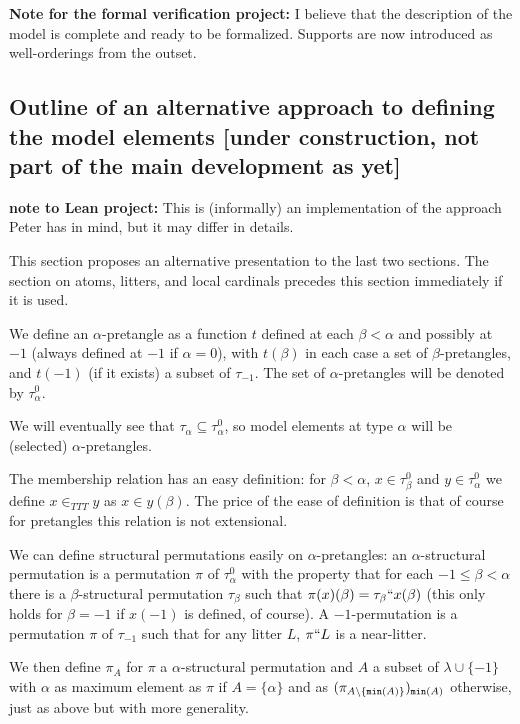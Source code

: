 \documentclass[112pt]{article}
\begin{document}

{\bf Note for the formal verification project:}  I believe that the description of the model is complete and ready to be formalized.   Supports are now introduced as well-orderings from the outset.


\subsection{Outline of an alternative approach to defining the model elements [under construction, not part of the main development as yet]}

{\bf note to Lean project:}  This is (informally) an implementation of the approach Peter has in mind, but it may differ in details.

This section proposes an alternative presentation to the last two sections.  The section on atoms, litters, and local cardinals precedes this section immediately if it is used.

We define an $\alpha$-pretangle as a function $t$ defined at each $\beta<\alpha$ and possibly at $-1$ (always defined at $-1$ if $\alpha=0$), with $t(\beta)$ in each case
a set of $\beta$-pretangles, and $t(-1)$ (if it exists) a subset of $\tau_{-1}$.   The set of $\alpha$-pretangles will be denoted by $\tau^0_\alpha$.

We will eventually see that $\tau_\alpha \subseteq \tau^0_\alpha$, so model elements at type $\alpha$ will be (selected) $\alpha$-pretangles.

The membership relation has an easy definition:  for $\beta<\alpha$, $x \in \tau^0_\beta$ and $y \in \tau^0_\alpha$ we define $x \in_{TTT} y$ as
$x \in y(\beta)$.  The price of the ease of definition is that of course for pretangles this relation is not extensional.

We can define structural permutations easily on $\alpha$-pretangles:  an $\alpha$-structural permutation is a permutation $\pi$ of
$\tau^0_\alpha$ with the property that for each $-1\leq \beta<\alpha$ there is a $\beta$-structural permutation $\tau_\beta$
such that $\pi(x)(\beta) = \tau_\beta``x(\beta)$ (this only holds for $\beta=-1$ if $x(-1)$ is defined, of course).  A $-1$-permutation
is a permutation $\pi$ of $\tau_{-1}$ such that for any litter $L$, $\pi``L$ is a near-litter.

We then define $\pi_A$ for $\pi$ a $\alpha$-structural permutation and $A$ a subset of $\lambda \cup \{-1\}$ with $\alpha$ as maximum element
as $\pi$ if $A = \{\alpha\}$ and as $(\pi_{A \setminus \{{\tt min}(A)\}})_{{\tt min}(A)}$ otherwise, just as above but with more generality.
\end{document}
